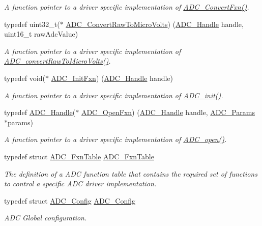 \begin{DoxyCompactItemize}
\begin{DoxyCompactList}\small\item\em A function pointer to a driver specific implementation of \hyperlink{_a_d_c_8h_a552f2f752fbfc1b2af7551e55e392a42}{A\+D\+C\+\_\+\+Convert\+Fxn()}. \end{DoxyCompactList}\item 
typedef uint32\+\_\+t($\ast$ \hyperlink{_a_d_c_8h_ab1b64068b8e0e3a26fa4b470cff92bf7}{A\+D\+C\+\_\+\+Convert\+Raw\+To\+Micro\+Volts}) (\hyperlink{_a_d_c_8h_ac98b1222559c172df43505d672e1376c}{A\+D\+C\+\_\+\+Handle} handle, uint16\+\_\+t raw\+Adc\+Value)
\begin{DoxyCompactList}\small\item\em A function pointer to a driver specific implementation of \hyperlink{_a_d_c_8h_a81e762c06c3957c01d3271bdecef358d}{A\+D\+C\+\_\+convert\+Raw\+To\+Micro\+Volts()}. \end{DoxyCompactList}\item 
typedef void($\ast$ \hyperlink{_a_d_c_8h_af5f90e5268e88d0bb56d40d53542b1da}{A\+D\+C\+\_\+\+Init\+Fxn}) (\hyperlink{_a_d_c_8h_ac98b1222559c172df43505d672e1376c}{A\+D\+C\+\_\+\+Handle} handle)
\begin{DoxyCompactList}\small\item\em A function pointer to a driver specific implementation of \hyperlink{_a_d_c_8h_a4b4a2ddcb45df0c8497c47d4ed800e2a}{A\+D\+C\+\_\+init()}. \end{DoxyCompactList}\item 
typedef \hyperlink{_a_d_c_8h_ac98b1222559c172df43505d672e1376c}{A\+D\+C\+\_\+\+Handle}($\ast$ \hyperlink{_a_d_c_8h_a753af5a6a07905e109bbdecb785ac44d}{A\+D\+C\+\_\+\+Open\+Fxn}) (\hyperlink{_a_d_c_8h_ac98b1222559c172df43505d672e1376c}{A\+D\+C\+\_\+\+Handle} handle, \hyperlink{struct_a_d_c___params}{A\+D\+C\+\_\+\+Params} $\ast$params)
\begin{DoxyCompactList}\small\item\em A function pointer to a driver specific implementation of \hyperlink{_a_d_c_8h_a9f3e5f311cda4df63e70660651b9314e}{A\+D\+C\+\_\+open()}. \end{DoxyCompactList}\item 
typedef struct \hyperlink{struct_a_d_c___fxn_table}{A\+D\+C\+\_\+\+Fxn\+Table} \hyperlink{_a_d_c_8h_a587cff1a3914cf624037cf8a01649380}{A\+D\+C\+\_\+\+Fxn\+Table}
\begin{DoxyCompactList}\small\item\em The definition of a A\+D\+C function table that contains the required set of functions to control a specific A\+D\+C driver implementation. \end{DoxyCompactList}\item 
typedef struct \hyperlink{struct_a_d_c___config}{A\+D\+C\+\_\+\+Config} \hyperlink{_a_d_c_8h_af334849657f87b79a31392f89828299a}{A\+D\+C\+\_\+\+Config}
\begin{DoxyCompactList}\small\item\em A\+D\+C Global configuration. \end{DoxyCompactList}\end{DoxyCompactItemize}
